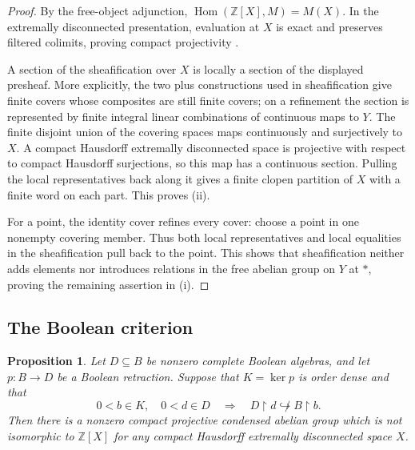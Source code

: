 \documentclass[11pt]{article}
\newtheorem{proposition}[theorem]{Proposition}
\theoremstyle{definition}
\theoremstyle{remark}
\newcommand{\Z}{\mathbb Z}
\newcommand{\restr}{\mathbin{\upharpoonright}}
\begin{document}
\begin{proof}
By the free-object adjunction,
$\operatorname{Hom}(\Z[X],M)=M(X)$. In the extremally disconnected
presentation, evaluation at $X$ is exact and preserves filtered
colimits, proving compact projectivity
\cite[proof of Theorem~2.2 and Proposition~2.7, p.~12]{ScholzeCondensed}.

A section of the sheafification over $X$ is locally a section of the
displayed presheaf. More explicitly, the two plus constructions used
in sheafification give finite covers whose composites are still finite
covers; on a refinement the section is represented by finite integral
linear combinations of continuous maps to $Y$. The finite disjoint
union of the covering spaces maps continuously and surjectively to
$X$. A compact Hausdorff extremally disconnected space is projective
with respect to compact Hausdorff surjections, so this map has a
continuous section. Pulling the local representatives back along it
gives a finite clopen partition of $X$ with a finite word on each part.
This proves (ii).

For a point, the identity cover refines every cover: choose a point in
one nonempty covering member. Thus both local representatives and
local equalities in the sheafification pull back to the point. This
shows that sheafification neither adds elements nor introduces
relations in the free abelian group on $Y$ at $*$, proving the
remaining assertion in (i).
\end{proof}

\subsection{The Boolean criterion}

\begin{proposition}
\label{prop:transfer}
Let $D\subseteq B$ be nonzero complete Boolean algebras, and let
$p:B\to D$ be a Boolean retraction. Suppose that $K=\ker p$ is order
dense and that
\begin{equation}
\label{eq:interval-obstruction}
 0<b\in K,\quad 0<d\in D
 \quad\Longrightarrow\quad
 D\restr d\not\hookrightarrow B\restr b.
\end{equation}
Then there is a nonzero compact projective condensed abelian group
which is not isomorphic to $\Z[X]$ for any compact Hausdorff
extremally disconnected space $X$.
\end{proposition}
\end{document}
